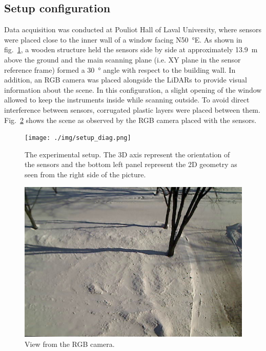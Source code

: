 \subsection{Setup configuration}

Data acquisition was conducted at Pouliot Hall of Laval University, where sensors were placed close to the inner wall of a window facing N\SI{50}{\degree}E. As shown in fig.~\ref{fig:setup}, a wooden structure held the sensors side by side at approximately \SI{13.9}{\meter} above the ground and the main scanning plane (i.e. XY plane in the sensor reference frame) formed a \SI{30}{\degree} angle with respect to the building wall. In addition, an RGB camera was placed alongside the LiDARs to provide visual information about the scene. In this configuration, a slight opening of the window allowed to keep the instruments inside while scanning outside. To avoid direct interference between sensors, corrugated plastic layers were placed between them. Fig.~\ref{fig:view} shows the scene as observed by the RGB camera placed with the sensors.

\begin{figure}[th]
    \centering
    \texttt{[image: ./img/setup\_diag.png]}
    \caption{The experimental setup. The 3D axis represent the orientation of the sensors and the bottom left panel represent the 2D geometry as seen from the right side of the picture.}
    \label{fig:setup}
\end{figure}

\begin{figure}[th]
    \centering
    \includegraphics[width=0.90\linewidth]{./img/camera_view.jpg}
    \caption{View from the RGB camera.}
    \label{fig:view}
\end{figure}

